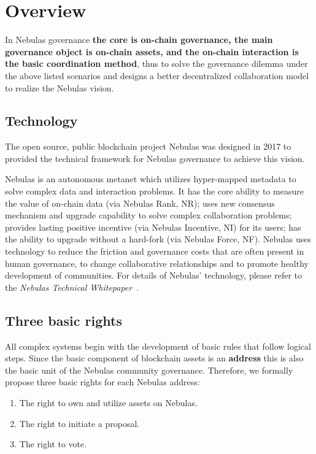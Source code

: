 \section{Overview}

In Nebulas governance \textbf{the core is on-chain governance, the main governance object is on-chain assets, and the on-chain interaction is the basic coordination method}, thus to solve the governance dilemma under the above listed scenarios and designs a better decentralized collaboration model to realize the Nebulas vision.

\subsection{Technology}

The open source, public blockchain project Nebulas was designed in 2017 to provided the technical framework for Nebulas governance to achieve this vision.

Nebulas is an autonomous metanet which utilizes hyper-mapped metadata to solve complex data and interaction problems. It has the core ability to measure the value of on-chain data (via Nebulas Rank, NR); uses new consensus mechanism and upgrade capability to solve complex collaboration problems; provides lasting positive incentive (via Nebulas Incentive, NI) for its users; has the ability to upgrade without a hard-fork (via Nebulas Force, NF). Nebulas uses technology to reduce the friction and governance costs that are often present in human governance, to change collaborative relationships and to promote healthy development of communities. For details of Nebulas' technology, please refer to the \textit{Nebulas Technical Whitepaper}~\cite{TechWhitepaper}.


\subsection{Three basic rights}
\label{rights}

All complex systems begin with the development of basic rules that follow logical steps. Since the basic component of blockchain assets is an \textbf{address} this is also the basic unit of the Nebulas community governance. Therefore, we formally propose three basic rights for each Nebulas address:

\begin{enumerate}
	\item The right to own and utilize assets on Nebulas.
	\item The right to initiate a proposal.
	\item The right to vote.
\end{enumerate}

